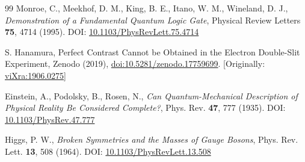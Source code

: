 \documentclass[%
 reprint,
 amsmath,amssymb,
 aps,
]{revtex4-1}
\numberwithin{equation}{section}%
\begin{document}
\begin{thebibliography}{99}
 Monroe, C., Meekhof, D. M., King, B. E., Itano, W. M., Wineland, D. J., 
\textit{Demonstration of a Fundamental Quantum Logic Gate},
Physical Review Letters \textbf{75}, 4714 (1995).
DOI: \href{https://doi.org/10.1103/PhysRevLett.75.4714}{10.1103/PhysRevLett.75.4714}

S. Hanamura, Perfect Contrast Cannot be Obtained in the Electron Double-Slit Experiment, Zenodo (2019), \href{https://doi.org/10.5281/zenodo.17759699}{doi:10.5281/zenodo.17759699}. [Originally: \href{https://vixra.org/abs/1906.0275}{viXra:1906.0275}]

 Einstein, A., Podolsky, B., Rosen, N., 
\textit{Can Quantum-Mechanical Description of Physical Reality Be Considered Complete?}, 
Phys. Rev. \textbf{47}, 777 (1935). DOI: \href{https://doi.org/10.1103/PhysRev.47.777}{10.1103/PhysRev.47.777}

 Higgs, P. W., 
\textit{Broken Symmetries and the Masses of Gauge Bosons}, 
Phys. Rev. Lett. \textbf{13}, 508 (1964). DOI: \href{https://doi.org/10.1103/PhysRevLett.13.508}{10.1103/PhysRevLett.13.508}

\end{thebibliography}


\end{document}
